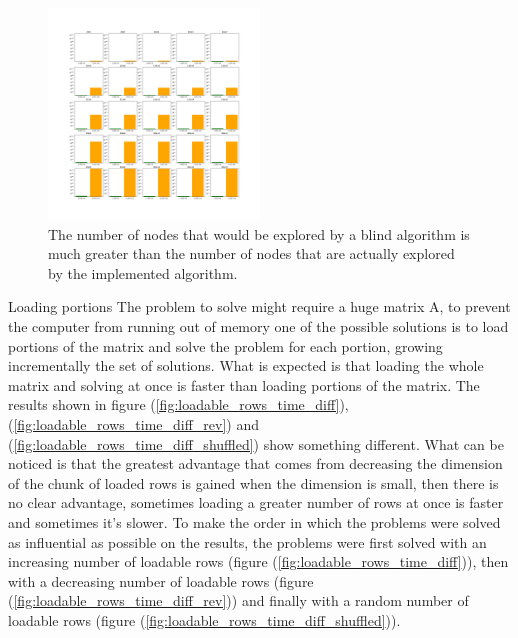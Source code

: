 \documentclass{beamer}
\begin{document}
\begin{frame}
    \begin{figure}
        \centering
        \includegraphics[width=0.5\textwidth]{explored_vs_explorable_5x5.pdf}
        \caption{The number of nodes that would be explored by a blind algorithm is
        much greater than the number of nodes that are actually explored by the implemented algorithm.}
        \label{fig:explored_vs_explorable_5x5}
    \end{figure}
\end{frame}

\begin{frame}{Loading portions}
    The problem to solve might require a huge matrix A,
    to prevent the computer from running out of memory
    one of the possible solutions is to load portions of the matrix
    and solve the problem for each portion, growing incrementally
    the set of solutions.
    What is expected is that loading the whole matrix and solving
    at once is faster than loading portions of the matrix.
    The results shown in figure (\ref{fig:loadable_rows_time_diff}), 
    (\ref{fig:loadable_rows_time_diff_rev}) and (\ref{fig:loadable_rows_time_diff_shuffled})
    show something different.
    What can be noticed is that the greatest advantage that comes
    from decreasing the dimension of the chunk of loaded rows is gained
    when the dimension is small, then there is no clear advantage,
    sometimes loading a greater number of rows at once is faster
    and sometimes it's slower.
    To make the order in which the problems were solved as influential as possible 
    on the results, the problems were first solved with an increasing number of loadable rows (figure (\ref{fig:loadable_rows_time_diff})),
    then with a decreasing number of loadable rows (figure (\ref{fig:loadable_rows_time_diff_rev})) and finally with a random number of loadable rows
    (figure (\ref{fig:loadable_rows_time_diff_shuffled})).
\end{frame}
\end{document}
